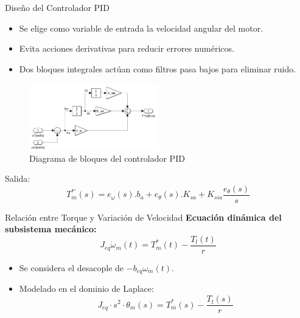 \documentclass[12pt]{beamer}
\begin{document}
\begin{frame}{Diseño del Controlador PID}
    \begin{itemize}
        \item Se elige como variable de entrada la velocidad angular del motor.
        \item Evita acciones derivativas para reducir errores numéricos.
        \item Dos bloques integrales actúan como filtros pasa bajos para eliminar ruido.
    \end{itemize}
    \begin{figure}[H]
        \centering
        \includegraphics[width=0.5\textwidth]{Imagenes/DiagramaBloquesPIDdesagregado.png}
        \caption{Diagrama de bloques del controlador PID}
\label{fig:DiagramaBloquesPIDdesagregado}
    \end{figure}

Salida:\
    \begin{equation}
T_m^{*'}(s) = e_\omega(s).b_a + e_\theta(s).K_{sa} + K_{sia}\frac{e_\theta(s)}{s}
\label{eq:torque_controlador}
\end{equation}
\end{frame}

\begin{frame}{Relación entre Torque y Variación de Velocidad}
    \textbf{Ecuación dinámica del subsistema mecánico:}
    \begin{equation}
        J_{eq}\dot{\omega}_m(t) = T_m^*(t) - \frac{T_l(t)}{r}
    \end{equation}
    \begin{itemize}
        \item Se considera el desacople de $-b_{eq}\omega_m(t)$.
        \item Modelado en el dominio de Laplace:
        \begin{equation}
            J_{eq} \cdot s^2 \cdot \theta_m(s) = T_m^*(s) - \frac{T_l(s)}{r}
        \end{equation}
    \end{itemize}
\end{frame}
\end{document}
